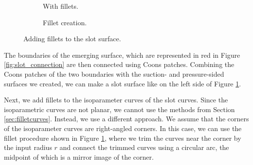 \documentclass[a4paper, 11pt]{report}
\theoremstyle{definition}
\begin{document}
\begin{figure}[H]
\begin{subfigure}{.39\textwidth}
			\caption{With fillets.}
		\end{subfigure}
		\begin{subfigure}{.2\textwidth}
			
			\vspace{1cm}
			\caption{Fillet creation.}
		\end{subfigure}
		\caption{Adding fillets to the slot surface.}
		\label{fig:slot_coon}
	\end{figure}

	The boundaries of the emerging surface, which are represented in red in Figure \ref{fig:slot_connection} are then connected using Coons patches. Combining the Coons patches of the two boundaries with the suction- and pressure-sided surfaces we created, we can make a slot surface like on the left side of Figure \ref{fig:slot_coon}.

	Next, we add fillets to the isoparameter curves of the slot curves. Since the isoparametric curves are not planar, we cannot use the methods from Section \ref{sec:filletcurves}. Instead, we use a different approach. We assume that the corners of the isoparameter curves are right-angled corners. In this case, we can use the fillet procedure shown in Figure \ref{fig:slot_coon}, where we trim the curves near the corner by the input radius $r$ and connect the trimmed curves using a circular arc, the midpoint of which is a mirror image of the corner.
\end{document}
